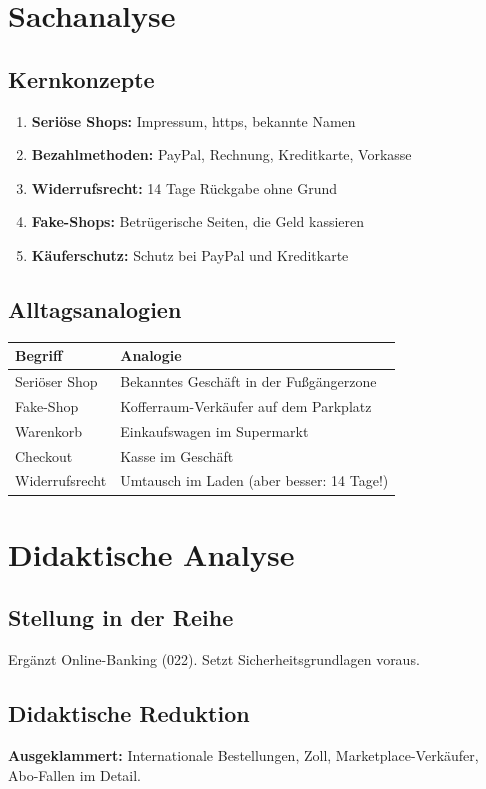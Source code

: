 \documentclass[11pt,a4paper]{article}
\begin{document}
\section{Sachanalyse}

\subsection{Kernkonzepte}
\begin{enumerate}
    \item \textbf{Seriöse Shops:} Impressum, https, bekannte Namen
    \item \textbf{Bezahlmethoden:} PayPal, Rechnung, Kreditkarte, Vorkasse
    \item \textbf{Widerrufsrecht:} 14 Tage Rückgabe ohne Grund
    \item \textbf{Fake-Shops:} Betrügerische Seiten, die Geld kassieren
    \item \textbf{Käuferschutz:} Schutz bei PayPal und Kreditkarte
\end{enumerate}

\subsection{Alltagsanalogien}
\begin{tabular}{|l|p{8cm}|}
\hline
\textbf{Begriff} & \textbf{Analogie} \\
\hline
Seriöser Shop & Bekanntes Geschäft in der Fußgängerzone \\
Fake-Shop & Kofferraum-Verkäufer auf dem Parkplatz \\
Warenkorb & Einkaufswagen im Supermarkt \\
Checkout & Kasse im Geschäft \\
Widerrufsrecht & Umtausch im Laden (aber besser: 14 Tage!) \\
\hline
\end{tabular}

\section{Didaktische Analyse}

\subsection{Stellung in der Reihe}
Ergänzt Online-Banking (022). Setzt Sicherheitsgrundlagen voraus.

\subsection{Didaktische Reduktion}
\textbf{Ausgeklammert:} Internationale Bestellungen, Zoll, Marketplace-Verkäufer, Abo-Fallen im Detail.
\end{document}
